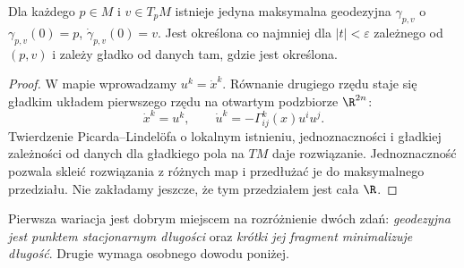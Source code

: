 \begin{stwierdzenie}
\label{prop:geodezyjna-dane-poczatkowe}
Dla każdego $p\in M$ i $v\in T_pM$ istnieje
jedyna maksymalna geodezyjna $\gamma_{p,v}$
o $\gamma_{p,v}(0)=p$, $\dot\gamma_{p,v}(0)=v$.
Jest określona co najmniej dla $|t|<\varepsilon$
zależnego od $(p,v)$ i zależy gładko od danych
tam, gdzie jest określona.
\end{stwierdzenie}
\begin{proof}
W mapie wprowadzamy $u^k=\dot x^k$.
Równanie drugiego rzędu staje się gładkim
układem pierwszego rzędu na otwartym
podzbiorze $\R^{2n}$:
\[
 \dot x^k=u^k,
 \qquad \dot u^k=-\Gamma^k_{ij}(x)u^iu^j.
\]
Twierdzenie Picarda--Lindelöfa o lokalnym
istnieniu, jednoznaczności i gładkiej zależności
od danych dla gładkiego pola na $TM$ daje
rozwiązanie. Jednoznaczność pozwala skleić
rozwiązania z różnych map i przedłużać je
do maksymalnego przedziału. Nie zakładamy
jeszcze, że tym przedziałem jest cała $\R$.
\end{proof}

Pierwsza wariacja jest dobrym miejscem na
rozróżnienie dwóch zdań: \emph{geodezyjna jest
punktem stacjonarnym długości} oraz
\emph{krótki jej fragment minimalizuje długość}.
Drugie wymaga osobnego dowodu poniżej.

